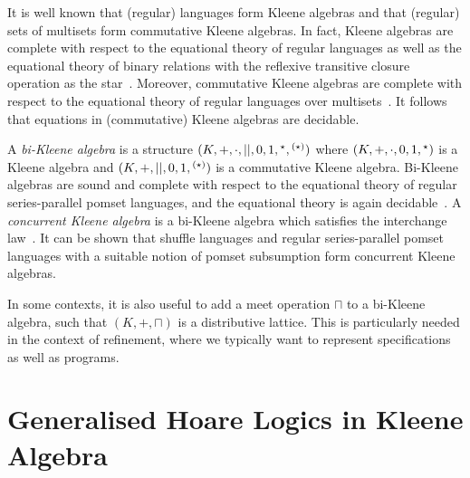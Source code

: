 \documentclass{llncs}
\begin{document}
It is well known that (regular) languages form Kleene algebras and
that (regular) sets of multisets form commutative Kleene algebras. In
fact, Kleene algebras are complete with respect to the equational
theory of regular languages as well as the equational theory of binary
relations with the reflexive transitive closure operation as the
star~\cite{kozen_completeness_1994}. Moreover, commutative Kleene
algebras are complete with respect to the equational theory of regular
languages over multisets~\cite{conway_regular_1971}. It follows that
equations in (commutative) Kleene algebras are decidable.

A \emph{bi-Kleene algebra} is a structure
$(K,+,\cdot,||,0,1,\hphantom{}^\star,\hphantom{}^{(\star)})$ where
$(K,+,\cdot,0,1,\hphantom{}^\star)$ is a Kleene algebra and
$(K,+,||,0,1,\hphantom{}^{(\star)})$ is a commutative Kleene
algebra. Bi-Kleene algebras are sound and complete with respect to the
equational theory of regular series-parallel pomset languages, and the
equational theory is again decidable~\cite{laurence_completeness_2013}. A
\emph{concurrent Kleene algebra} is a bi-Kleene algebra which
satisfies the interchange law~\cite{hoare_concurrent_2011}. It can be shown that
shuffle languages and regular series-parallel pomset languages with a
suitable notion of pomset subsumption form concurrent Kleene algebras.

In some contexts, it is also useful to add a meet operation $\sqcap$ to a bi-Kleene algebra,
such that $(K,+,\sqcap)$ is a distributive lattice. This is
particularly needed in the context of refinement, where we typically
want to represent specifications as well as programs.



\section{Generalised Hoare Logics  in Kleene Algebra}
\end{document}
